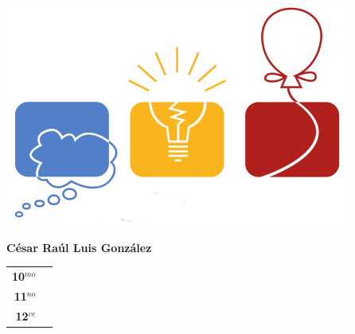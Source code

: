 \begin{minipage}{0.2\textwidth}
	\includegraphics[width=\linewidth]{img/icpc.png} %
\end{minipage}
\hfill
\begin{minipage}{0.7\textwidth}
	\textbf{César Raúl Luis González}
	
	\vspace*{0.1in}
	\begin{tabular}{rl}
		
		\textbf{10$^{mo}$} &   \\
		
		\textbf{11$^{no}$} &  \\
		
		\textbf{12$^{ce}$} &   \\
		
		
	\end{tabular}
\end{minipage}

